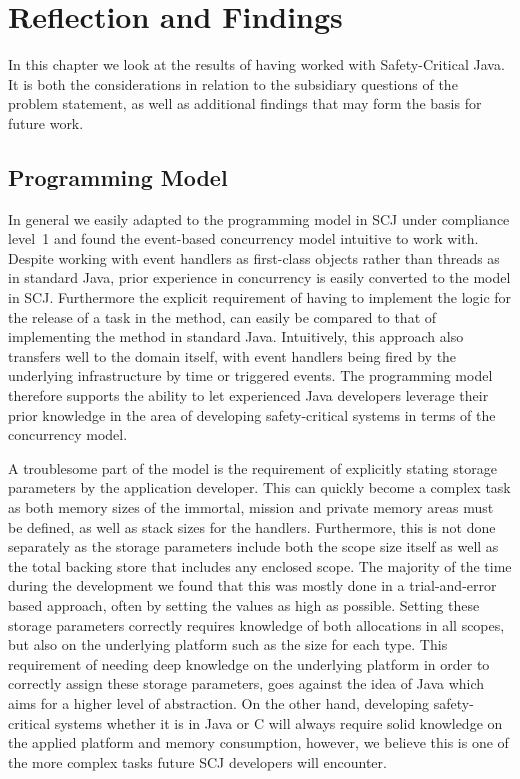 \chapter{Reflection and Findings}
\label{chapter:Reflection}
In this chapter we look at the results of having worked with Safety-Critical Java. It is both the considerations in relation to the subsidiary questions of the problem statement, as well as additional findings that may form the basis for future work.

\section{Programming Model} 
\label{sec:programming_model}
In general we easily adapted to the programming model in SCJ under compliance level~1 and found the event-based concurrency model intuitive to work with. Despite working with event handlers as first-class objects rather than threads as in standard Java, prior experience in concurrency is easily converted to the model in SCJ. Furthermore the explicit requirement of having to implement the logic for the release of a task in the  method, can easily be compared to that of implementing the  method in standard Java. Intuitively, this approach also transfers well to the domain itself, with event handlers being fired by the underlying infrastructure by time or triggered events. The programming model therefore supports the ability to let experienced Java developers leverage their prior knowledge in the area of developing safety-critical systems in terms of the concurrency model.

A troublesome part of the model is the requirement of explicitly stating storage parameters by the application developer. This can quickly become a complex task as both memory sizes of the immortal, mission and private memory areas must be defined, as well as stack sizes for the handlers. Furthermore, this is not done separately as the storage parameters include both the scope size itself as well as the total backing store that includes any enclosed scope. The majority of the time during the development we found that this was mostly done in a trial-and-error based approach, often by setting the values as high as possible. Setting these storage parameters correctly requires knowledge of both allocations in all scopes, but also on the underlying platform such as the size for each type. This requirement of needing deep knowledge on the underlying platform in order to correctly assign these storage parameters, goes against the idea of Java which aims for a higher level of abstraction. On the other hand, developing safety-critical systems whether it is in Java or C will always require solid knowledge on the applied platform and memory consumption, however, we believe this is one of the more complex tasks future SCJ developers will encounter.

